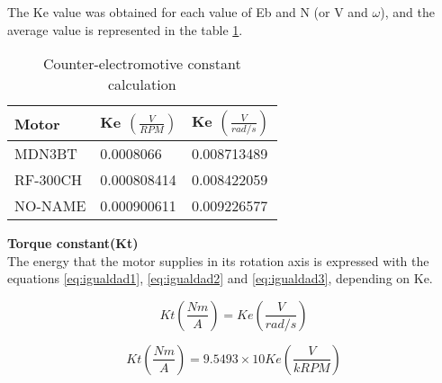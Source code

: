 The Ke value was obtained for each value of Eb and N (or V and $\omega$), and the average value is represented in the table \ref{tab:Ke}.

\begin{table}[H]
\centering
\begin{tabular}{ | l | l |l |}
\hline\hline
	\textbf{Motor} & \textbf{Ke $\left(\frac{V}{RPM}\right)$} & \textbf{Ke $\left(\frac{V}{rad/s}\right)$}\\ \hline
	MDN3BT & 0.0008066 &	0.008713489 			\\ \hline
RF-300CH & 0.000808414 &	0.008422059  \\ \hline
NO-NAME & 0.000900611 &		0.009226577	\\ \hline\hline 
\end{tabular}
\caption{Counter-electromotive constant calculation} \label{tab:Ke}
\end{table}



\textbf{Torque constant(Kt)} \\
The energy that the motor supplies in its rotation axis is expressed with the equations \ref{eq:igualdad1}, \ref{eq:igualdad2} and \ref{eq:igualdad3}, depending on Ke.

%
%
%
%
%
%
%
%
%
\begin{equation}   
Kt\left(\frac{Nm}{A}\right)= Ke \left(\frac{V}{rad/s}\right)
\label{eq:igualdad1}
\end{equation}

\begin{equation}   
Kt\left(\frac{Nm}{A}\right)= 9.5493 \times 10 Ke \left(\frac{V}{kRPM}\right)
\label{eq:igualdad2}
\end{equation}

